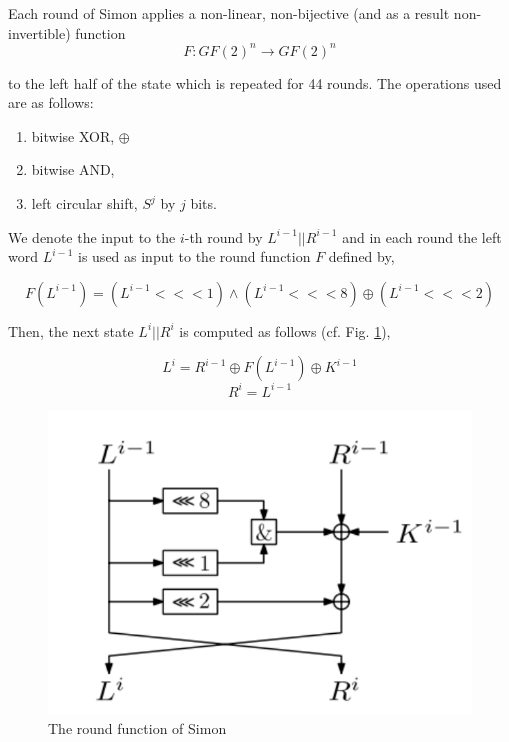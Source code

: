 Each round of Simon applies a non-linear, non-bijective (and as a result
non-invertible) function
\begin{equation}
F:GF(2)^n\rightarrow GF(2)^n
\end{equation}

to the left half of the state which is repeated for 44 rounds.
The operations used are as follows:

\begin{enumerate}
	\item bitwise XOR, $\oplus$
	\item bitwise AND,
	\item left circular shift, $S^j$ by $j$ bits.
\end{enumerate}

We denote the input to the $i$-th round by $L^{i-1}||R^{i-1}$
and in each round the left word $L^{i-1}$ is used as input
to the round function $F$ defined by,

\begin{equation}
F(L^{i-1})=(L^{i-1}<<<1)\wedge(L^{i-1}<<<8)\oplus(L^{i-1}<<<2)
\end{equation}

Then, the next state $L^{i}||R^{i}$ is computed as follows
(cf. Fig. \ref{fig:SIMONroundfn}),

\begin{equation}
L^i=R^{i-1}\oplus F(L^{i-1})\oplus K^{i-1}
\end{equation}
\begin{equation}
R^i=L^{i-1}
\end{equation}


\begin{figure}[!h]
	\vspace{-0.2cm}
	\centering
	\includegraphics[width=120mm]{./pics/SIMONroundfn-eps-converted-to.pdf}
	\caption{The round function of Simon}
	\label{fig:SIMONroundfn}
	\vspace{-0.1cm}
\end{figure}


